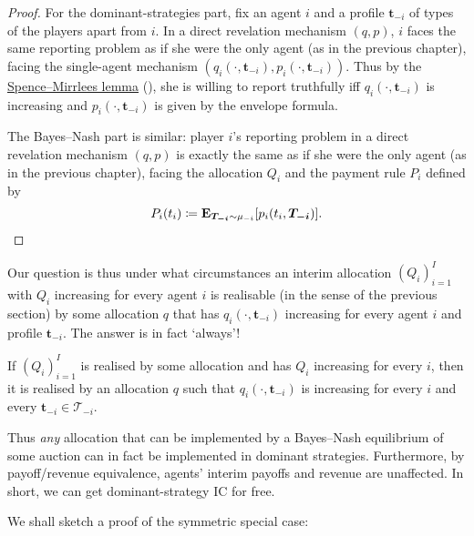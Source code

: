 \begin{proof}
	For the dominant-strategies part,
	fix an agent $i$
	and a profile $\boldsymbol{t}_{-i}$ of types of the players apart from $i$.
	In a direct revelation mechanism $(q,p)$,
	$i$ faces the same reporting problem
	as if she were the only agent (as in the previous chapter), facing the single-agent mechanism $\left( q_i\left(\cdot,\boldsymbol{t}_{-i}\right), p_i\left(\cdot,\boldsymbol{t}_{-i}\right) \right)$.
	Thus by the \hyperref[proposition:SM_lemma]{Spence--Mirrlees lemma} (), she is willing to report truthfully iff $q_i\left(\cdot,\boldsymbol{t}_{-i}\right)$ is increasing and $p_i\left(\cdot,\boldsymbol{t}_{-i} \right)$ is given by the envelope formula.

	The Bayes--Nash part is similar:
	player $i$'s reporting problem in a direct revelation mechanism $(q,p)$
	is exactly the same as if she were the only agent (as in the previous chapter),
	facing the allocation $Q_i$ and the payment rule $P_i$ defined by
	\begin{equation*}
		P_i(t_i)
		\coloneqq \E_{\boldsymbol{T_{-i}} \sim \mu_{-i}}\left[ p_i(t_i,\boldsymbol{T_{-i}}) \right] . \qedhere
	\end{equation*}
\end{proof}

Our question is thus under what circumstances an interim allocation $(Q_i)_{i=1}^I$ with $Q_i$ increasing for every agent $i$
is realisable (in the sense of the previous section) by some allocation $q$ that has $q_i(\cdot,\boldsymbol{t}_{-i})$ increasing for every agent $i$ and profile $\boldsymbol{t}_{-i}$.
The answer is in fact `always'!

\begin{theorem}
	\label{theorem:manellivincent}
	If $(Q_i)_{i=1}^I$ is realised by some allocation
	and has $Q_i$ increasing for every $i$,
	then it is realised by an allocation $q$ such that $q_i(\cdot,\boldsymbol{t}_{-i})$ is increasing for every $i$ and every $\boldsymbol{t}_{-i} \in \mathcal{T}_{-i}$.
\end{theorem}


Thus \emph{any} allocation that can be implemented by a Bayes--Nash equilibrium of some auction
can in fact be implemented in dominant strategies.
Furthermore, by payoff/revenue equivalence, agents' interim payoffs and revenue are unaffected.
In short, we can get dominant-strategy IC for free.


We shall sketch a proof of the symmetric special case:

